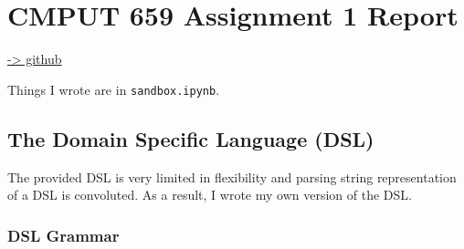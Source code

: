 \documentclass[]{article}
\date{}
\begin{document}
\section{CMPUT 659 Assignment 1
Report}\label{cmput-659-assignment-1-report}

\href{https://github.com/uduse/cmput-659-xai}{-\textgreater{} github}

Things I wrote are in \texttt{sandbox.ipynb}.

\subsection{The Domain Specific Language
(DSL)}\label{the-domain-specific-language-dsl}

The provided DSL is very limited in flexibility and parsing string
representation of a DSL is convoluted. As a result, I wrote my own
version of the DSL.

\subsubsection{DSL Grammar}\label{dsl-grammar}
\end{document}
